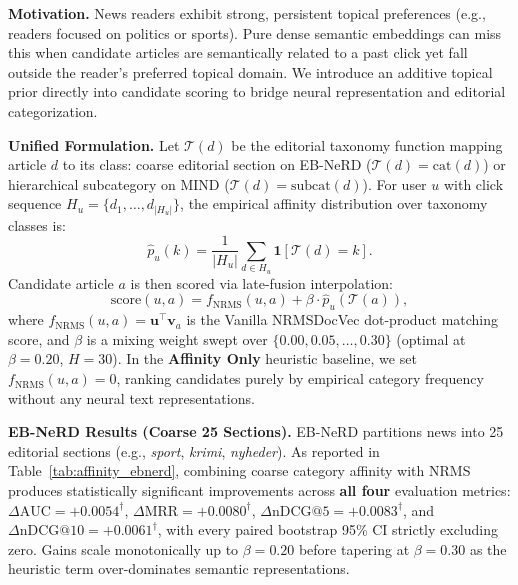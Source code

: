 \documentclass[11pt,a4paper]{article}
\begin{document}
\textbf{Motivation.} News readers exhibit strong, persistent topical preferences (e.g., readers focused on politics or sports). Pure dense semantic embeddings can miss this when candidate articles are semantically related to a past click yet fall outside the reader's preferred topical domain. We introduce an additive topical prior directly into candidate scoring to bridge neural representation and editorial categorization.

\textbf{Unified Formulation.} Let $\mathcal{T}(d)$ be the editorial taxonomy function mapping article $d$ to its class: coarse editorial section on EB-NeRD ($\mathcal{T}(d) = \text{cat}(d)$) or hierarchical subcategory on MIND ($\mathcal{T}(d) = \text{subcat}(d)$). For user $u$ with click sequence $H_u = \{d_1,\dots,d_{|H_u|}\}$, the empirical affinity distribution over taxonomy classes is:
\[
  \hat{p}_u(k) = \frac{1}{|H_u|} \sum_{d \in H_u} \mathbf{1}\!\left[\mathcal{T}(d) = k\right].
\]
Candidate article $a$ is then scored via late-fusion interpolation:
\[
  \text{score}(u, a) = f_{\text{NRMS}}(u, a) + \beta \cdot \hat{p}_u\!\left(\mathcal{T}(a)\right),
\]
where $f_{\text{NRMS}}(u,a) = \mathbf{u}^\top \mathbf{v}_a$ is the Vanilla NRMSDocVec dot-product matching score, and $\beta$ is a mixing weight swept over $\{0.00, 0.05, \ldots, 0.30\}$ (optimal at $\beta{=}0.20$, $H{=}30$). In the \textbf{Affinity Only} heuristic baseline, we set $f_{\text{NRMS}}(u,a) = 0$, ranking candidates purely by empirical category frequency without any neural text representations.

\textbf{EB-NeRD Results (Coarse 25 Sections).} EB-NeRD partitions news into 25 editorial sections (e.g., \textit{sport}, \textit{krimi}, \textit{nyheder}). As reported in Table~\ref{tab:affinity_ebnerd}, combining coarse category affinity with NRMS produces statistically significant improvements across \textbf{all four} evaluation metrics: $\Delta\text{AUC} = +0.0054^\dagger$, $\Delta\text{MRR} = +0.0080^\dagger$, $\Delta\text{nDCG@5} = +0.0083^\dagger$, and $\Delta\text{nDCG@10} = +0.0061^\dagger$, with every paired bootstrap 95\% CI strictly excluding zero. Gains scale monotonically up to $\beta{=}0.20$ before tapering at $\beta{=}0.30$ as the heuristic term over-dominates semantic representations.
\end{document}
